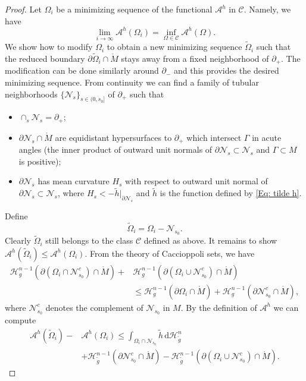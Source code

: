 \documentclass[11pt,letterpaper]{amsart}
\numberwithin{equation}{section}
\theoremstyle{definition}
\begin{document}
\begin{proof}
Let $\Omega_i$ be a minimizing sequence of the functional $\mathcal A^h$ in $\mathcal C$. Namely, we have
$$
\lim_{i\to\infty}\mathcal A^h(\Omega_i)=\inf_{\Omega\in\mathcal C}\mathcal A^h(\Omega).
$$
We show how to modify $\Omega_i$ to obtain a new minimizing sequence $\tilde \Omega_i$ such that the reduced boundary $\partial\tilde\Omega_i\cap\mathring M$ stays away from a fixed neighborhood of $\partial_+$. The modification can be done similarly around $\partial_-$ and this provides the desired minimizing sequence. From continuity we can find a family of tubular neighborhoods $\{\mathcal N_s\}_{s\in (0,s_0]}$ of $\partial_+$ such that
\begin{itemize}\setlength{\itemsep}{1mm}
\item $\cap_s\mathcal N_s=\partial_+$;
\item $\partial\mathcal N_s\cap\mathring M$ are equidistant hypersurfaces to $\partial_+$ which intersect $\Gamma$ in acute angles (the inner product of outward unit normals of $\partial\mathcal N_s\subset \mathcal N_s$ and $\Gamma\subset M$ is positive);
\item $\partial\mathcal N_s$ has mean curvature $H_s$ with respect to outward unit normal of $\partial\mathcal N_s\subset \mathcal N_s$, where $H_s<-\tilde h|_{\partial\mathcal N_s}$ and $\tilde h$ is the function defined by \eqref{Eq: tilde h}.
\end{itemize}
Define
$$
\tilde \Omega_i=\Omega_i-\mathcal N_{s_0}.
$$
Clearly $\tilde \Omega_i$ still belongs to the class $\mathcal C$ {defined as above}. It remains to show $\mathcal A^h(\tilde \Omega_i)\leq \mathcal A^h(\Omega_i)$. {From the theory of Caccioppoli sets, we have
\[
\begin{split}
    \mathcal H_g^{n-1}(\partial(\Omega_i\cap\mathcal N_{s_0}^c)\cap \mathring M)+&\mathcal H_g^{n-1}(\partial(\Omega_i\cup\mathcal N_{s_0}^c)\cap\mathring M)\\&\leq \mathcal H_g^{n-1}(\partial\Omega_i\cap\mathring M)+\mathcal H_g^{n-1}(\partial\mathcal N_{s_0}^c\cap \mathring M),
\end{split}
\]
where $\mathcal N_{s_0}^c$ denotes the complement of $\mathcal N_{s_0}$ in $M$.
By the definition of $\mathcal A^h$ we can compute
\[
\begin{split}
\mathcal A^h(\tilde \Omega_i)-&\mathcal A^h(\Omega_i)\leq\int_{\Omega_i\cap \mathcal N_{s_0}}\tilde h\,\mathrm d\mathcal H^n_{\tilde g}\\
&+\mathcal H^{n-1}_{\tilde g}(\partial\mathcal N_{s_0}^c\cap\mathring M)-\mathcal H^{n-1}_{\tilde g}(\partial (\Omega_i\cup \mathcal N_{s_0}^c)\cap \mathring M).

\end{split}\]}
\end{proof}
\end{document}

